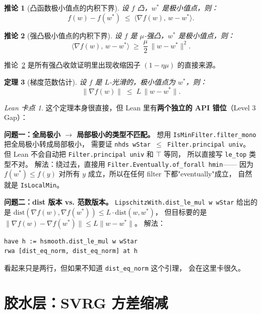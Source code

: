 \documentclass[11pt]{article}
\newtheorem{theorem}{定理}[section]
\newtheorem{corollary}[theorem]{推论}
\theoremstyle{remark}
\newtheorem*{leanremark}{Lean 卡点}
\begin{document}
\begin{corollary}[凸函数极小值点的内积下界]
  \label{cor:convex-inner-lb}
  设 $f$ 凸，$w^*$ 是极小值点，则：
  \[
    f(w) - f(w^*) \;\leq\; \langle \nabla f(w),\, w - w^* \rangle.
  \]
\end{corollary}

\begin{corollary}[强凸极小值点的内积下界]
  \label{cor:sc-inner-lb}
  设 $f$ 是 $\mu$-强凸，$w^*$ 是极小值点，则：
  \[
    \langle \nabla f(w),\, w - w^* \rangle
    \;\geq\; \frac{\mu}{2}\,\|w - w^*\|^2.
  \]
\end{corollary}

推论~\ref{cor:sc-inner-lb} 是所有强凸收敛证明里出现收缩因子
$(1-\eta\mu)$ 的直接来源。

\begin{theorem}[梯度范数估计]
  \label{thm:grad-norm}
  设 $f$ 是 $L$-光滑的，极小值点为 $w^*$，则：
  \[
    \|\nabla f(w)\| \;\leq\; L\,\|w - w^*\|.
  \]
\end{theorem}

\begin{leanremark}
  这个定理本身很直接，但 Lean 里有\textbf{两个独立的 API 错位}（Level 3 Gap）：

  \textbf{问题一：全局极小 $\to$ 局部极小的类型不匹配。}
  想用 \texttt{IsMinFilter.filter\_mono} 把全局极小转成局部极小，
  需要证 \texttt{nhds wStar $\leq$ Filter.principal univ}。
  但 Lean 不会自动把 \texttt{Filter.principal univ} 和 \texttt{$\top$} 等同，
  所以直接写 \texttt{le\_top} 类型不对。
  解法：绕过去，直接用 \texttt{Filter.Eventually.of\_forall hmin}——
  因为 $f(w^*) \leq f(y)$ 对所有 $y$ 成立，所以在任何 filter 下都"eventually"成立，
  自然就是 \texttt{IsLocalMin}。

  \textbf{问题二：dist 版本 vs. 范数版本。}
  \texttt{LipschitzWith.dist\_le\_mul w wStar} 给出的是
  $\mathrm{dist}(\nabla f(w), \nabla f(w^*)) \leq L \cdot \mathrm{dist}(w, w^*)$，
  但目标要的是 $\|\nabla f(w) - \nabla f(w^*)\| \leq L\|w - w^*\|$。
  解法：
\begin{lstlisting}[language={}]
have h := hsmooth.dist_le_mul w wStar
rwa [dist_eq_norm, dist_eq_norm] at h
\end{lstlisting}
  看起来只是两行，但如果不知道 \texttt{dist\_eq\_norm} 这个引理，
  会在这里卡很久。
\end{leanremark}

\section{胶水层：SVRG 方差缩减}
\end{document}

